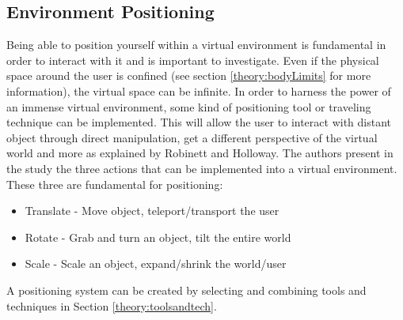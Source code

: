 \subsection{Environment Positioning}
Being able to position yourself within a virtual environment is fundamental in order to interact with it and is important to investigate\cite{tools:warren2014perception}. Even if the physical space around the user is confined (see section \ref{theory:bodyLimits} for more information), the virtual space can be infinite. In order to harness the power of an immense virtual environment, some kind of positioning tool or traveling technique can be implemented. This will allow the user to interact with distant object through direct manipulation, get a different perspective of the virtual world and more as explained by Robinett and Holloway\cite{positioning:Robinett1992}. The authors present in the study the three actions that can be implemented into a virtual environment. These three are fundamental for positioning:
\begin{itemize}
  \item Translate - Move object, teleport/transport the user
  \item Rotate - Grab and turn an object, tilt the entire world
  \item Scale - Scale an object, expand/shrink the world/user
\end{itemize}

A positioning system can be created by selecting and combining tools and techniques in Section \ref{theory:toolsandtech}.
